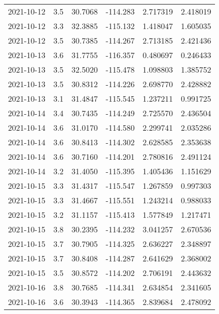 \begin{tabular}{lrrrrr}
2021-10-12 &       3.5 &  30.7068 &  -114.283 &         2.717319 &         2.418019 \\
2021-10-12 &       3.3 &  32.3885 &  -115.132 &         1.418047 &         1.605035 \\
2021-10-12 &       3.5 &  30.7385 &  -114.267 &         2.713185 &         2.421436 \\
2021-10-13 &       3.6 &  31.7755 &  -116.357 &         0.480697 &         0.246433 \\
2021-10-13 &       3.5 &  32.5020 &  -115.478 &         1.098803 &         1.385752 \\
2021-10-13 &       3.5 &  30.8312 &  -114.226 &         2.698770 &         2.428882 \\
2021-10-13 &       3.1 &  31.4847 &  -115.545 &         1.237211 &         0.991725 \\
2021-10-14 &       3.4 &  30.7435 &  -114.249 &         2.725570 &         2.436504 \\
2021-10-14 &       3.6 &  31.0170 &  -114.580 &         2.299741 &         2.035286 \\
2021-10-14 &       3.6 &  30.8413 &  -114.302 &         2.628585 &         2.353638 \\
2021-10-14 &       3.6 &  30.7160 &  -114.201 &         2.780816 &         2.491124 \\
2021-10-14 &       3.2 &  31.4050 &  -115.395 &         1.405436 &         1.151629 \\
2021-10-15 &       3.3 &  31.4317 &  -115.547 &         1.267859 &         0.997303 \\
2021-10-15 &       3.3 &  31.4667 &  -115.551 &         1.243214 &         0.988033 \\
2021-10-15 &       3.2 &  31.1157 &  -115.413 &         1.577849 &         1.217471 \\
2021-10-15 &       3.8 &  30.2395 &  -114.232 &         3.041257 &         2.670536 \\
2021-10-15 &       3.7 &  30.7905 &  -114.325 &         2.636227 &         2.348897 \\
2021-10-15 &       3.7 &  30.8408 &  -114.287 &         2.641629 &         2.368002 \\
2021-10-15 &       3.5 &  30.8572 &  -114.202 &         2.706191 &         2.443632 \\
2021-10-16 &       3.8 &  30.7685 &  -114.341 &         2.634854 &         2.341605 \\
2021-10-16 &       3.6 &  30.3943 &  -114.365 &         2.839684 &         2.478092 \\

\end{tabular}
